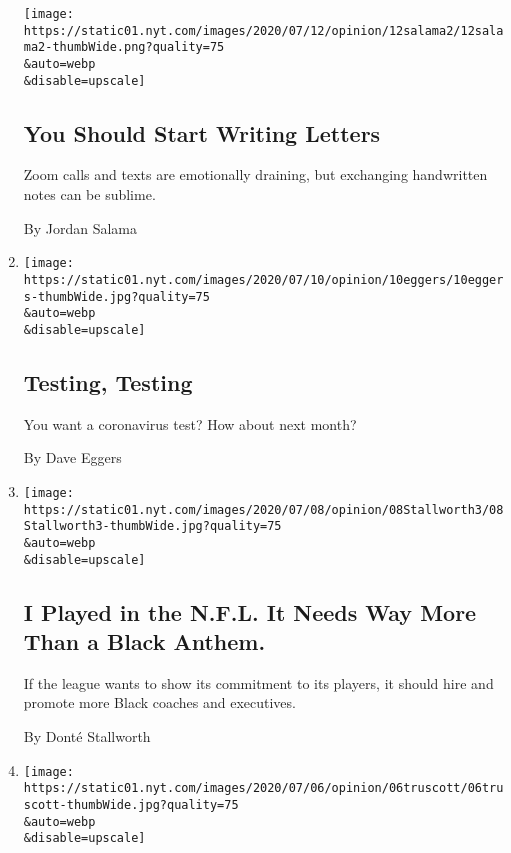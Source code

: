 \begin{enumerate}
  \texttt{[image: https://static01.nyt.com/images/2020/07/12/opinion/12salama2/12salama2-thumbWide.png?quality=75\\\&auto=webp\\\&disable=upscale]}

  \hypertarget{you-should-start-writing-letters}{%
  \subsection{You Should Start Writing
  Letters}\label{you-should-start-writing-letters}}

  Zoom calls and texts are emotionally draining, but exchanging
  handwritten notes can be sublime.

  By Jordan Salama
\item
  \href{/2020/07/10/opinion/culture/coronavirus-testing-eggers.html}{}

  \texttt{[image: https://static01.nyt.com/images/2020/07/10/opinion/10eggers/10eggers-thumbWide.jpg?quality=75\\\&auto=webp\\\&disable=upscale]}

  \hypertarget{testing-testing}{%
  \subsection{Testing, Testing}\label{testing-testing}}

  You want a coronavirus test? How about next month?

  By Dave Eggers
\item
  \href{/2020/07/08/opinion/culture/NFL-black-anthem-kaepernick-trump.html}{}

  \texttt{[image: https://static01.nyt.com/images/2020/07/08/opinion/08Stallworth3/08Stallworth3-thumbWide.jpg?quality=75\\\&auto=webp\\\&disable=upscale]}

  \hypertarget{i-played-in-the-nfl-it-needs-way-more-than-a-black-anthem}{%
  \subsection{I Played in the N.F.L. It Needs Way More Than a Black
  Anthem.}\label{i-played-in-the-nfl-it-needs-way-more-than-a-black-anthem}}

  If the league wants to show its commitment to its players, it should
  hire and promote more Black coaches and executives.

  By Donté Stallworth
\item
  \href{/2020/07/06/opinion/thomas-jefferson-memorial-truscott.html}{}

  \texttt{[image: https://static01.nyt.com/images/2020/07/06/opinion/06truscott/06truscott-thumbWide.jpg?quality=75\\\&auto=webp\\\&disable=upscale]}


\end{enumerate}
